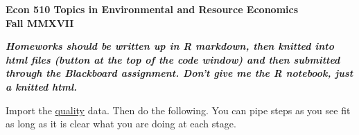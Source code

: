 \documentclass[11pt]{article}
\begin{document}
\baselineskip=12pt
\begin{center}
\textbf{Econ 510 Topics in Environmental and Resource Economics\\Fall MMXVII}
\end{center}


\smallskip

\textbf{\emph{Homeworks should be written up in R markdown, then knitted into html files (button at the top of the code window) and then submitted through the Blackboard assignment. Don't give me the R notebook, just a knitted html. }}


\bigskip

Import the \underline{quality} data. Then do the following. You can pipe steps as you see fit as long as it is clear what you are doing at each stage.
\end{document}
